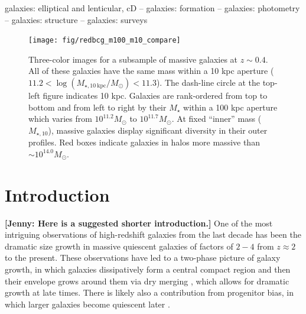 \documentclass[a4paper,fleqn,usenatbib]{mnras}
\def\mstar{{$M_{\star}$}}
\newcommand{\jenny}[1]{\textcolor{Bittersweet}{\textbf{[Jenny: #1]}}}
\begin{document}
\begin{keywords}
    galaxies: elliptical and lenticular, cD --
    galaxies: formation --
    galaxies: photometry -- 
    galaxies: structure -- 
    galaxies: surveys
\end{keywords}



  \begin{figure}
      \centering 
      \texttt{[image: fig/redbcg\_m100\_m10\_compare]}
      \caption{
          Three-color images for a subsample of massive galaxies at $z{\sim}0.4$. 
          All of these galaxies have the same mass within a 10 kpc aperture 
          ($11.2<\log (M_{\star,10\ \mathrm{kpc}}/M_{\odot})<11.3$). 
          The dash-line circle at the top-left figure indicates 10 kpc.
          Galaxies are rank-ordered from top to bottom and from left to right by 
          their \mstar{} within a 100 kpc aperture which varies from $10^{11.2} M_{\odot}$ 
          to $10^{11.7} M_{\odot}$. 
          At fixed ``inner'' mass ($M_{\star,10}$), massive galaxies display significant
          diversity in their outer profiles. 
          Red boxes indicate galaxies in halos more massive than 
          ${\sim} 10^{14.0} M_{\odot}$. 
          }
      \label{fig:m100_m10_color}
  \end{figure}

\section{Introduction}
    \label{sec:intro}
    
    \jenny{Here is a suggested shorter introduction.}   
    One of the most intriguing observations of high-redshift galaxies from the last decade has 
    been the dramatic size growth in massive quiescent galaxies 
    \citep{Trujillo2006,vanDokkum2008,Damjanov2009,Cimatti2008} of factors of $2-4$ from $z \approx 2$ to the present. 
    These observations have led to a two-phase picture of galaxy growth,
    in which galaxies dissipatively form a central compact region and then their envelope grows around 
    them via dry merging \citep[e.g,][]{Naab2006, Khochfar2006,Oser2010, Oser2012}, which allows for 
    dramatic growth at late times. 
    There is likely also a contribution from progenitor bias, in which larger galaxies become quiescent 
    later \citep[e.g.,][]{Newman2012,XX}. 
\end{document}
